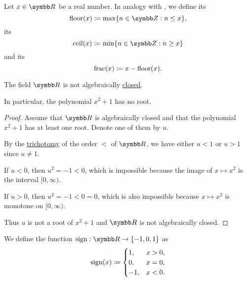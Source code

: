 \begin{definition}\label{def:floor_ceiling_functions}
  Let \( x \in \BR \) be a real number. In analogy with , we define its 
  \begin{equation*}
    \Floor(x) \coloneqq \max \{ n \in \BZ : n \leq x \},
  \end{equation*}
  its 
  \begin{equation*}
    \Ceil(x) \coloneqq \min \{ n \in \BZ : n \geq x \}
  \end{equation*}
  and its 
  \begin{equation*}
    \operatorname{frac}(x) \coloneqq x - \operatorname{floor}(x).
  \end{equation*}
\end{definition}

\begin{proposition}\label{thm:reals_not_algebraically_closed}
  The field \( \BR \) is not algebraically \hyperref[def:algebraically_closed_field]{closed}.

  In particular, the polynomial \( x^2 + 1 \) has no root.
\end{proposition}
\begin{proof}
  Assume that \( \BR \) is algebraically closed and that the polynomial \( x^2 + 1 \) has at least one root. Denote one of them by \( u \).

  By the \hyperref[def:binary_relation/trichotomic]{trichotomy} of the order \( < \) of \( \BR \), we have either \( u < 1 \) or \( u > 1 \) since \( u \neq 1 \).

  If \( u < 0 \), then \( u^2 = -1 < 0 \), which is impossible because the image of \( x \mapsto x^2 \) is the interval \( [0, \infty) \).

  If \( u > 0 \), then \( u^2 = -1 < 0 = 0 \), which is also impossible because \( x \mapsto x^2 \) is monotone on \( [0, \infty) \).

  Thus \( u \) is not a root of \( x^2 + 1 \) and \( \BR \) is not algebraically closed.
\end{proof}

\begin{definition}\label{def:signum}
  We define the  function \( \Sign: \BR \to \{ -1, 0, 1 \} \) as
  \begin{equation*}
    \operatorname{sign}(x) \coloneqq \begin{cases}
      1,  &x > 0, \\
      0,  &x = 0, \\
      -1, &x < 0.
    \end{cases}
  \end{equation*}
\end{definition}
